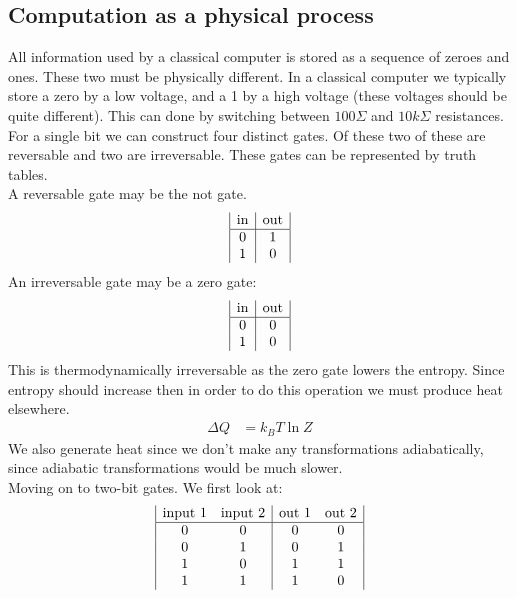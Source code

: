 \subsection{Computation as a physical process}
All information used by a classical computer is stored as a sequence of zeroes and ones. These two must be physically different. In a classical computer we typically store a zero by a low voltage, and a 1 by a high voltage (these voltages should be quite different). This can done by switching between $100 \Sigma$ and $10k\Sigma$ resistances. \\
For a single bit we can construct four distinct gates. Of these two of these are reversable and two are irreversable. These gates can be represented by truth tables.\\
A reversable gate may be the not gate.
\begin{displaymath}
\begin{array}{| c | c |}
	\text{in} & \text{out} \\
	\hline
	0 & 1 \\
	1 & 0
\end{array}
\end{displaymath}
An irreversable gate may be a zero gate:
\begin{displaymath}
\begin{array}{| c | c |}
	\text{in} & \text{out} \\
	\hline
	0 & 0 \\
	1 & 0
\end{array}
\end{displaymath}
This is thermodynamically irreversable as the zero gate lowers the entropy. Since entropy should increase then in order to do this operation we must produce heat elsewhere.
\begin{align*}
	\Delta Q &= k_B T\ln Z
\end{align*}
We also generate heat since we don't make any transformations adiabatically, since adiabatic transformations would be much slower. \\
Moving on to two-bit gates. We first look at:
\begin{displaymath}
\begin{array}{| c c | c c |}
	\text{input 1} & \text{input 2} & \text{out 1} & \text{out 2} \\
	\hline
	0 & 0 & 0 & 0\\
	0 & 1 & 0 & 1\\
	1 & 0 & 1 & 1\\
	1 & 1 & 1 & 0
\end{array}
\end{displaymath}
